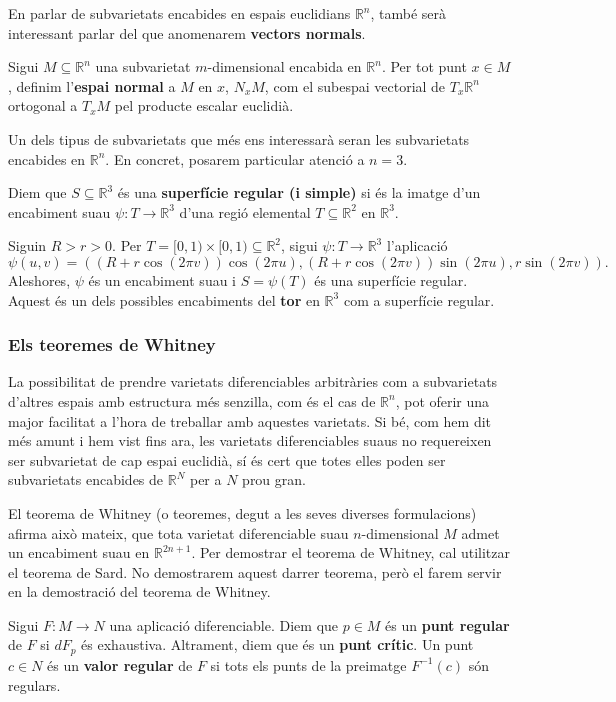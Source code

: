 En parlar de subvarietats encabides en espais euclidians $\mathbb R^n$, també serà interessant parlar del que anomenarem \textbf{vectors normals}.
\begin{defi}\label{def:espai_normal}
    Sigui $M\subseteq\mathbb R^n$ una subvarietat $m$-dimensional encabida en $\mathbb R^n$. Per tot punt $x\in M$, definim l'\textbf{espai normal} a $M$ en $x$, $N_xM$, com el subespai vectorial de $T_x\mathbb R^n$ ortogonal a $T_xM$ pel producte escalar euclidià.
\end{defi}

Un dels tipus de subvarietats que més ens interessarà seran les subvarietats encabides en $\mathbb R^n$. En concret, posarem particular atenció a $n=3$.

\begin{defi}
    Diem que $S\subseteq\mathbb R^3$ és una \textbf{superfície regular (i simple)} si és la imatge d'un encabiment suau $\psi:T\to\mathbb R^3$ d'una regió elemental $T\subseteq\mathbb R^2$ en $\mathbb R^3$.
\end{defi}

\begin{ex}
    Siguin $R>r>0$. Per $T = [0,1)\times[0,1)\subseteq\mathbb R^2$, sigui $\psi:T\to\mathbb R^3$ l'aplicació
    \begin{equation*}
        \psi(u,v) = \left( (R+r\cos(2\pi v))\cos(2\pi u), (R+r\cos(2\pi v))\sin(2\pi u), r\sin(2\pi v) \right).
    \end{equation*}
    Aleshores, $\psi$ és un encabiment suau i $S = \psi(T)$ és una superfície regular. Aquest és un dels possibles encabiments del \textbf{tor} en $\mathbb R^3$ com a superfície regular.
\end{ex}

\subsubsection{Els teoremes de Whitney}
La possibilitat de prendre varietats diferenciables arbitràries com a subvarietats d'altres espais amb estructura més senzilla, com és el cas de $\mathbb R^n$, pot oferir una major facilitat a l'hora de treballar amb aquestes varietats. Si bé, com hem dit més amunt i hem vist fins ara, les varietats diferenciables suaus no requereixen ser subvarietat de cap espai euclidià, sí és cert que totes elles poden ser subvarietats encabides de $\mathbb R^N$ per a $N$ prou gran.

El teorema de Whitney (o teoremes, degut a les seves diverses formulacions) afirma això mateix, que tota varietat diferenciable suau $n$-dimensional $M$ admet un encabiment suau en $\mathbb R^{2n+1}$. Per demostrar el teorema de Whitney, cal utilitzar el teorema de Sard. No demostrarem aquest darrer teorema, però el farem servir en la demostració del teorema de Whitney.
\begin{defi}
    Sigui $F:M\to N$ una aplicació diferenciable. Diem que $p\in M$ és un \textbf{punt regular} de $F$ si $dF_p$ és exhaustiva. Altrament, diem que és un \textbf{punt crític}. Un punt $c\in N$ és un \textbf{valor regular} de $F$ si tots els punts de la preimatge $F^{-1}(c)$ són regulars.
\end{defi}

